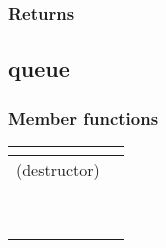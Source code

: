 \documentclass[letterpaper,10pt,english]{sphinxmanual}
\begin{document}
\subsubsection*{Returns}


\subsection{queue}
\label{\detokenize{programming-interface/runtime/queue:queue}}\label{\detokenize{programming-interface/runtime/queue::doc}}
\begin{sphinxVerbatim}[commandchars=\\\{\}]
 
\end{sphinxVerbatim}
\subsubsection*{Member functions}


\begin{savenotes}\sphinxattablestart
\centering
\begin{tabulary}{\linewidth}[t]{|T|T|}
\hline

{\hyperref[\detokenize{programming-interface/runtime/queue:constructor}]{}}
&\\
\hline
(destructor)
&\\
\hline
{\hyperref[\detokenize{programming-interface/runtime/queue:get}]{}}
&\\
\hline
{\hyperref[\detokenize{programming-interface/runtime/queue:get-context}]{}}
&\\
\hline
{\hyperref[\detokenize{programming-interface/runtime/queue:get-device}]{}}
&\\
\hline
{\hyperref[\detokenize{programming-interface/runtime/queue:get-info}]{}}
&\\
\hline
{\hyperref[\detokenize{programming-interface/runtime/queue:is-host}]{}}
&\\
\hline
{\hyperref[\detokenize{programming-interface/runtime/queue:submit}]{}}
&\\
\hline
{\hyperref[\detokenize{programming-interface/runtime/queue:wait}]{}}
&\\
\hline
{\hyperref[\detokenize{programming-interface/runtime/queue:wait-and-throw}]{}}
&\\
\hline
{\hyperref[\detokenize{programming-interface/runtime/queue:throw-asynchronous}]{}}
&\\
\hline
\end{tabulary}
\par
\sphinxattableend\end{savenotes}
\end{document}
